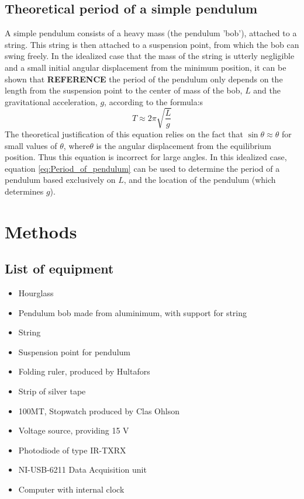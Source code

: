 \documentclass[a4paper, 10pt]{article}
\begin{document}
\subsection{Theoretical period of a simple pendulum}
A simple pendulum consists of a heavy mass (the pendulum 'bob'), attached to a string. This string is then attached to a suspension point, from which the bob can swing freely. In the idealized case that the mass of the string is utterly negligible and a small initial angular displacement from the minimum position, it can be shown that \textbf{REFERENCE} the period of the pendulum only depends on the length from the suspension point to the center of mass of the bob, $L$ and the gravitational acceleration, $g$, according to the formula:s
\begin{equation}\label{eq:Period_of_pendulum}
T\approx2\pi \sqrt{\frac{L}{g}}
\end{equation}
The theoretical justification of this equation relies on the fact that $\sin \theta \approx \theta$ for small values of $\theta$, where$\theta$ is the angular displacement from the equilibrium position. Thus this equation is incorrect for large angles. In this idealized case, equation \ref{eq:Period_of_pendulum} can be used to determine the period of a pendulum based exclusively on $L$, and the location of the pendulum (which determines $g$). 
\section{Methods}
\subsection{List of equipment}
\begin{itemize}
\item Hourglass
\item Pendulum bob made from aluminimum, with support for string
\item String
\item Suspension point for pendulum
\item Folding ruler, produced by Hultafors
\item Strip of silver tape 
\item 100MT, Stopwatch produced by Clas Ohlson
\item Voltage source, providing 15 V
\item Photodiode of type IR-TXRX
\item NI-USB-6211 Data Acquisition unit
\item Computer with internal clock
\end{itemize}
\end{document}
